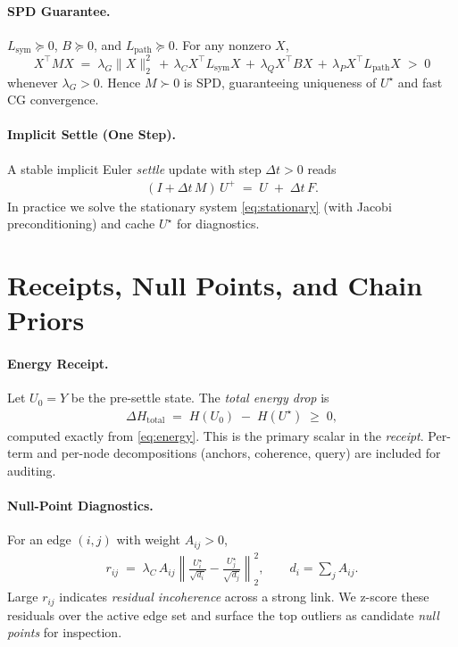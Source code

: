 \documentclass[11pt]{article}
\begin{document}
\paragraph{SPD Guarantee.}
$L_{\mathrm{sym}}\succeq 0$, $B\succeq 0$, and $L_{\mathrm{path}}\succeq 0$. For any nonzero $X$,
\[
X^\top M X \;=\; \lambda_G \|X\|_2^2 \,+\, \lambda_C X^\top L_{\mathrm{sym}}X \,+\, \lambda_Q X^\top B X \,+\, \lambda_P X^\top L_{\mathrm{path}} X \;>\; 0
\]
whenever $\lambda_G>0$. Hence $M\succ 0$ is SPD, guaranteeing uniqueness of $U^\star$ and fast CG convergence.

\paragraph{Implicit Settle (One Step).}
A stable implicit Euler \emph{settle} update with step $\Delta t>0$ reads
\begin{align}
(I + \Delta t\,M) \, U^+ \;=\; U \;+\; \Delta t \, F .
\end{align}
In practice we solve the stationary system \eqref{eq:stationary} (with Jacobi preconditioning) and cache $U^\star$ for diagnostics.

\vspace{-0.5em}
\section{Receipts, Null Points, and Chain Priors}
\paragraph{Energy Receipt.}
Let $U_0\!=\!Y$ be the pre-settle state. The \emph{total energy drop} is
\begin{align}
\Delta H_{\mathrm{total}}
\;=\;
H(U_0) \;-\; H(U^\star)
\;\ge\; 0,
\end{align}
computed exactly from \eqref{eq:energy}. This is the primary scalar in the \emph{receipt}. Per-term and per-node decompositions (anchors, coherence, query) are included for auditing.

\paragraph{Null-Point Diagnostics.}
For an edge $(i,j)$ with weight $A_{ij}\!>\!0$,
\begin{align}
r_{ij}
\;=\;
\lambda_C \, A_{ij}
\left\|
\frac{U^\star_i}{\sqrt{d_i}} - \frac{U^\star_j}{\sqrt{d_j}}
\right\|_2^2,
\qquad d_i = \sum_j A_{ij}.
\end{align}
Large $r_{ij}$ indicates \emph{residual incoherence} across a strong link. We z-score these residuals over the active edge set and surface the top outliers as candidate \emph{null points} for inspection.
\end{document}
